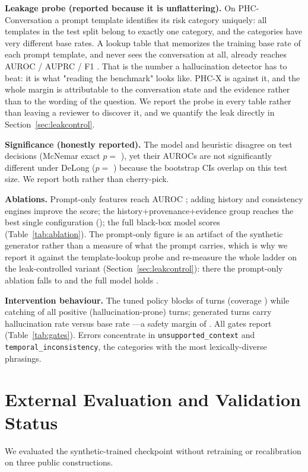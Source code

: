 \documentclass[conference,a4paper]{IEEEtran}
\begin{document}
\textbf{Leakage probe (reported because it is unflattering).} On
PHC-Conversation a prompt template identifies its risk category uniquely:
all \ntemplates{} templates in the test split belong to exactly one
category, and the categories have very different base rates. A lookup table
that memorizes the training base rate of each prompt template, and never
sees the conversation at all, already reaches AUROC \lookupauroc{} /
AUPRC \lookupauprc{} / F1 \lookupfone{}. That is the number a
hallucination detector has to beat: it is what "reading the benchmark"
looks like. PHC-X is \auroc{} against it, and the whole margin is
attributable to the conversation state and the evidence rather than to the
wording of the question. We report the probe in every table rather than
leaving a reviewer to discover it, and we quantify the leak directly in
Section~\ref{sec:leakcontrol}.

\textbf{Significance (honestly reported).} The model and heuristic disagree
on \ndiscordant{} test decisions (McNemar exact $p=$ \pmcnemar), yet their
AUROCs are not significantly different under DeLong ($p=$ \pdelong) because
the bootstrap CIs overlap on this test size. We report both rather than
cherry-pick.

\textbf{Ablations.} Prompt-only features reach AUROC \promptauroc; adding
history and consistency engines improve the score; the
history+provenance+evidence group reaches the best single configuration
(\evidenceauroc); the full black-box model scores \auroc
(Table~\ref{tab:ablation}). The prompt-only figure is an artifact of the
synthetic generator rather than a measure of what the prompt carries, which
is why we report it against the template-lookup probe and re-measure the
whole ladder on the leak-controlled variant
(Section~\ref{sec:leakcontrol}): there the prompt-only ablation falls to
\lcprompt{} and the full model holds \lcauc{}.

\textbf{Intervention behaviour.} The tuned policy blocks \blockedshare{} of turns
(coverage \coverage) while catching \caught{} of all positive (hallucination-prone)
turns; generated turns carry hallucination rate \riskgenerated{}
versus base rate \riskoverall---a safety margin of \safetymargin. All gates
report \gatestatus{} (Table~\ref{tab:gates}).
Errors concentrate in \texttt{unsupported\_context} and
\texttt{temporal\_inconsistency}, the categories with the most
lexically-diverse phrasings.

\section{External Evaluation and Validation Status}
We evaluated the synthetic-trained checkpoint without retraining or
recalibration on three public constructions.
\end{document}
